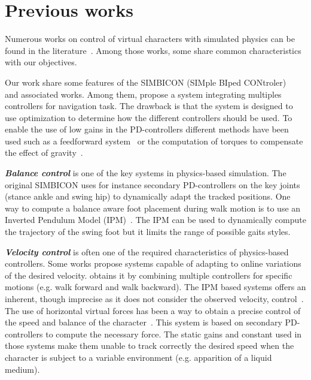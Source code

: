 \documentclass[conference]{acmsiggraph}
\begin{document}
\section{Previous works}
\label{sec:previous_works}

Numerous works on control of virtual characters with simulated physics can be found in the literature~\cite{geijtenbeek2012interactive}. Among those works, some share common characteristics with our objectives.

Our work share some features of the SIMBICON (SIMple BIped CONtroler)~\cite{yin2007simbicon} and associated works. Among them, \cite{coros2009robust} propose a system integrating multiples controllers for navigation task. The drawback is that the system is designed to use optimization to determine how the different controllers should be used. To enable the use of low gains in the PD-controllers different methods have been used such as a feedforward system~\cite{yin2007simbicon} or the computation of torques to compensate the effect of gravity~\cite{coros2010generalized}.

\textbf{\textit{Balance control}} is one of the key systems in physics-based simulation. The original SIMBICON uses for instance secondary PD-controllers on the key joints (stance ankle and swing hip) to dynamically adapt the tracked positions. One way to compute a balance aware foot placement during walk motion is to use an Inverted Pendulum Model (IPM)~\cite{coros2010generalized,kajita20013d}. The IPM can be used to dynamically compute the trajectory of the swing foot but it limits the range of possible gaits styles.

\textbf{\textit{Velocity control}} is often one of the required characteristics of physics-based controllers. Some works propose systems capable of adapting to online variations of the desired velocity. \cite{coros2009robust} obtains it by combining multiple controllers for specific motions (e.g. walk forward and walk backward). The IPM based systems offers an inherent, though imprecise as it does not consider the observed velocity, control~\cite{coros2010generalized}. The use of horizontal virtual forces has been a way to obtain a precise control of the speed and balance of the character~\cite{coros2010generalized,geijtenbeek2012simple}. This system is based on secondary PD-controllers to compute the necessary force. The static gains and constant used in those systems make them unable to track correctly the desired speed when the character is subject to a variable environment (e.g. apparition of a liquid medium). 
\end{document}
